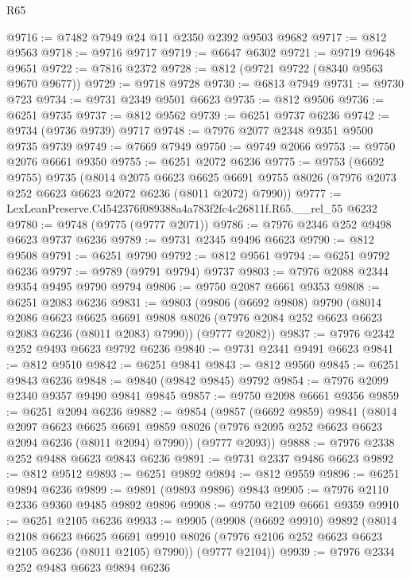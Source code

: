 \begin{lexlean}{R65}
\begin{coremodule}
{@9716 := @7482 @7949 @24 @11 @2350 @2392 @9503 @9682
@9717 := @812 @9563
@9718 := @9716 @9717
@9719 := @6647 @6302
@9721 := @9719 @9648 @9651
@9722 := @7816 @2372
@9728 := @812 (@9721 @9722 (@8340 @9563 @9670 @9677))
@9729 := @9718 @9728
@9730 := @6813 @7949
@9731 := @9730 @723
@9734 := @9731 @2349 @9501 @6623
@9735 := @812 @9506
@9736 := @6251 @9735
@9737 := @812 @9562
@9739 := @6251 @9737 @6236
@9742 := @9734 (@9736 @9739) @9717
@9748 := @7976 @2077 @2348 @9351 @9500 @9735 @9739
@9749 := @7669 @7949
@9750 := @9749 @2066
@9753 := @9750 @2076 @6661 @9350
@9755 := @6251 @2072 @6236
@9775 := @9753
    (@6692 @9755)
    @9735
    (@8014
      @2075
      @6623
      @6625
      @6691
      @9755
      @8026
      (@7976 @2073 @252 @6623 @6623 @2072 @6236 (@8011 @2072) @7990))
@9777 := LexLeanPreserve.Cd542376f089388a4a783f2fc4c26811f.R65.__rel_55 @6232
@9780 := @9748 (@9775 (@9777 @2071))
@9786 := @7976 @2346 @252 @9498 @6623 @9737 @6236
@9789 := @9731 @2345 @9496 @6623
@9790 := @812 @9508
@9791 := @6251 @9790
@9792 := @812 @9561
@9794 := @6251 @9792 @6236
@9797 := @9789 (@9791 @9794) @9737
@9803 := @7976 @2088 @2344 @9354 @9495 @9790 @9794
@9806 := @9750 @2087 @6661 @9353
@9808 := @6251 @2083 @6236
@9831 := @9803
    (@9806
      (@6692 @9808)
      @9790
      (@8014
        @2086
        @6623
        @6625
        @6691
        @9808
        @8026
        (@7976 @2084 @252 @6623 @6623 @2083 @6236 (@8011 @2083) @7990))
      (@9777 @2082))
@9837 := @7976 @2342 @252 @9493 @6623 @9792 @6236
@9840 := @9731 @2341 @9491 @6623
@9841 := @812 @9510
@9842 := @6251 @9841
@9843 := @812 @9560
@9845 := @6251 @9843 @6236
@9848 := @9840 (@9842 @9845) @9792
@9854 := @7976 @2099 @2340 @9357 @9490 @9841 @9845
@9857 := @9750 @2098 @6661 @9356
@9859 := @6251 @2094 @6236
@9882 := @9854
    (@9857
      (@6692 @9859)
      @9841
      (@8014
        @2097
        @6623
        @6625
        @6691
        @9859
        @8026
        (@7976 @2095 @252 @6623 @6623 @2094 @6236 (@8011 @2094) @7990))
      (@9777 @2093))
@9888 := @7976 @2338 @252 @9488 @6623 @9843 @6236
@9891 := @9731 @2337 @9486 @6623
@9892 := @812 @9512
@9893 := @6251 @9892
@9894 := @812 @9559
@9896 := @6251 @9894 @6236
@9899 := @9891 (@9893 @9896) @9843
@9905 := @7976 @2110 @2336 @9360 @9485 @9892 @9896
@9908 := @9750 @2109 @6661 @9359
@9910 := @6251 @2105 @6236
@9933 := @9905
    (@9908
      (@6692 @9910)
      @9892
      (@8014
        @2108
        @6623
        @6625
        @6691
        @9910
        @8026
        (@7976 @2106 @252 @6623 @6623 @2105 @6236 (@8011 @2105) @7990))
      (@9777 @2104))
@9939 := @7976 @2334 @252 @9483 @6623 @9894 @6236
}
\end{coremodule}
\end{lexlean}

